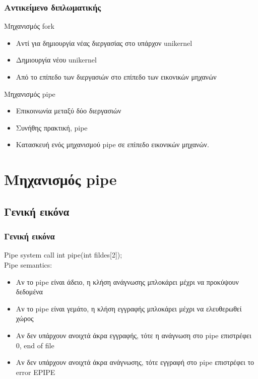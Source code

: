 \documentclass[red,slidestop,notes,compress,mathserif]{beamer}
\begin{document}
\begin{frame}
\frametitle{Αντικείμενο διπλωματικής}
\begin{block}{Μηχανισμός fork}
\begin{itemize}
\item Αντί για δημιουργία νέας διεργασίας στο υπάρχον unikernel
\item Δημιουργία νέου unikernel
\item Από το επίπεδο των διεργασιών στο επίπεδο των εικονικών μηχανών
\end{itemize}
\end{block}
\begin{block}{Μηχανισμός pipe}
\begin{itemize}
\item Επικοινωνία μεταξύ δύο διεργασιών
\item Συνήθης πρακτική, pipe
\item Κατασκευή ενός μηχανισμού pipe σε επίπεδο εικονικών μηχανών. 
\end{itemize}
\end{block}
\end{frame}

\section{Μηχανισμός pipe}
\subsection{Γενική εικόνα}

\begin{frame}
\frametitle{Γενική εικόνα}
\begin{block}{Pipe system call}
int pipe(int fildes[2]); \\
Pipe semantics:
\begin{itemize}
\item Αν το pipe είναι άδειο, η κλήση ανάγνωσης μπλοκάρει μέχρι να προκύψουν δεδομένα
\item Αν το pipe είναι γεμάτο, η κλήση εγγραφής μπλοκάρει μέχρι να ελευθερωθεί χώρος
\item Αν δεν υπάρχουν ανοιχτά άκρα εγγραφής, τότε η ανάγνωση στο pipe επιστρέφει 0, end of file
\item Αν δεν υπάρχουν ανοιχτά άκρα ανάγνωσης, τότε εγγραφή στο pipe επιστρέφει το error EPIPE
\end{itemize}
\end{block}
\end{frame}
\end{document}
